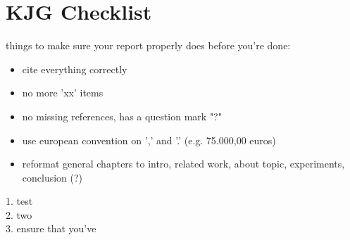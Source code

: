 %
%
%
%
%
%
%
%

\newpage
\section{KJG Checklist}

things to make sure your report properly does before you're done:\\
\begin{itemize}
\item cite everything correctly
\item no more 'xx' items
\item no missing references, has a question mark "?"
\item use european convention on ',' and '.' (e.g. 75.000,00 euros)
\item reformat general chapters to intro, related work, about topic, experiments, conclusion (?)
\end{itemize}
1. test \\
2. two \\
3. ensure that you've 

